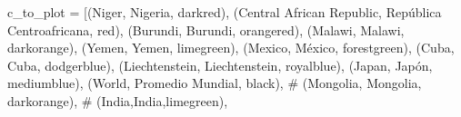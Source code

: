 \documentclass[
  letterpaper,
  DIV=11,
  numbers=noendperiod]{scrreprt}
\newenvironment{Shaded}{\begin{snugshade}}{\end{snugshade}}
\newcommand{\CommentTok}[1]{\textcolor[rgb]{0.37,0.37,0.37}{#1}}
\newcommand{\NormalTok}[1]{\textcolor[rgb]{0.00,0.23,0.31}{#1}}
\newcommand{\OperatorTok}[1]{\textcolor[rgb]{0.37,0.37,0.37}{#1}}
\newcommand{\StringTok}[1]{\textcolor[rgb]{0.13,0.47,0.30}{#1}}
\begin{document}
\begin{Shaded}
\begin{Highlighting}[]
\NormalTok{c\_to\_plot }\OperatorTok{=}\NormalTok{ [(}\StringTok{\textquotesingle{}Niger\textquotesingle{}}\NormalTok{, }\StringTok{\textquotesingle{}Nigeria\textquotesingle{}}\NormalTok{, }\StringTok{\textquotesingle{}darkred\textquotesingle{}}\NormalTok{), }
\NormalTok{             (}\StringTok{\textquotesingle{}Central African Republic\textquotesingle{}}\NormalTok{, }\StringTok{\textquotesingle{}República Centroafricana\textquotesingle{}}\NormalTok{, }\StringTok{\textquotesingle{}red\textquotesingle{}}\NormalTok{),}
\NormalTok{             (}\StringTok{\textquotesingle{}Burundi\textquotesingle{}}\NormalTok{, }\StringTok{\textquotesingle{}Burundi\textquotesingle{}}\NormalTok{, }\StringTok{\textquotesingle{}orangered\textquotesingle{}}\NormalTok{),}
\NormalTok{             (}\StringTok{\textquotesingle{}Malawi\textquotesingle{}}\NormalTok{, }\StringTok{\textquotesingle{}Malawi\textquotesingle{}}\NormalTok{, }\StringTok{\textquotesingle{}darkorange\textquotesingle{}}\NormalTok{),}
\NormalTok{             (}\StringTok{\textquotesingle{}Yemen\textquotesingle{}}\NormalTok{, }\StringTok{\textquotesingle{}Yemen\textquotesingle{}}\NormalTok{, }\StringTok{\textquotesingle{}limegreen\textquotesingle{}}\NormalTok{), }
\NormalTok{             (}\StringTok{\textquotesingle{}Mexico\textquotesingle{}}\NormalTok{, }\StringTok{\textquotesingle{}México\textquotesingle{}}\NormalTok{, }\StringTok{\textquotesingle{}forestgreen\textquotesingle{}}\NormalTok{),}
\NormalTok{             (}\StringTok{\textquotesingle{}Cuba\textquotesingle{}}\NormalTok{, }\StringTok{\textquotesingle{}Cuba\textquotesingle{}}\NormalTok{, }\StringTok{\textquotesingle{}dodgerblue\textquotesingle{}}\NormalTok{),}
\NormalTok{             (}\StringTok{\textquotesingle{}Liechtenstein\textquotesingle{}}\NormalTok{, }\StringTok{\textquotesingle{}Liechtenstein\textquotesingle{}}\NormalTok{, }\StringTok{\textquotesingle{}royalblue\textquotesingle{}}\NormalTok{),}
\NormalTok{             (}\StringTok{\textquotesingle{}Japan\textquotesingle{}}\NormalTok{, }\StringTok{\textquotesingle{}Japón\textquotesingle{}}\NormalTok{, }\StringTok{\textquotesingle{}mediumblue\textquotesingle{}}\NormalTok{),}
\NormalTok{             (}\StringTok{\textquotesingle{}World\textquotesingle{}}\NormalTok{, }\StringTok{\textquotesingle{}Promedio Mundial\textquotesingle{}}\NormalTok{, }\StringTok{\textquotesingle{}black\textquotesingle{}}\NormalTok{),}
\CommentTok{\#             (\textquotesingle{}Mongolia\textquotesingle{}, \textquotesingle{}Mongolia\textquotesingle{}, \textquotesingle{}darkorange\textquotesingle{}),}
\CommentTok{\#             (\textquotesingle{}India\textquotesingle{},\textquotesingle{}India\textquotesingle{},\textquotesingle{}limegreen\textquotesingle{}),}

\end{Highlighting}
\end{Shaded}
\end{document}
